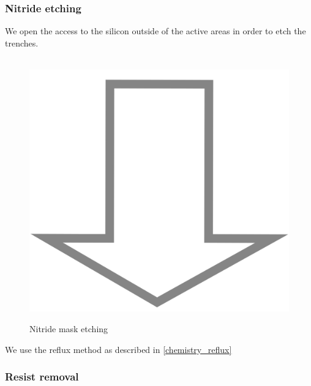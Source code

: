 \subsubsection{Nitride etching}\label{sti_nitride_etch}
We open the access to the silicon outside of the active areas in order to etch the trenches.
\begin{figure}[H]
	\centering
	\begin{tikzpicture}[node distance = 3cm, auto, thick,scale=\CrossSectionOnly, every node/.style={transform shape}]
		
	\end{tikzpicture} \\
	\includegraphics[scale=0.01]{down_arrow.png} \\
	\begin{tikzpicture}[node distance = 3cm, auto, thick,scale=\CrossSectionOnly, every node/.style={transform shape}]
		
	\end{tikzpicture}
	\caption{Nitride mask etching}
\end{figure}
We use the reflux method as described in \autoref{chemistry_reflux}

\subsubsection{Resist removal}


